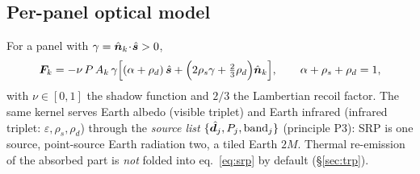 \subsection{Per-panel optical model}
For a panel with $\gamma=\hat{\bm{n}}_k\!\cdot\!\hat{\bm{s}}>0$,
\begin{equation}
\bm{F}_k=-\nu\,P\,A_k\,\gamma\Big[(\alpha+\rho_d)\,\hat{\bm{s}}+\Big(2\rho_s\gamma+\tfrac23\rho_d\Big)\hat{\bm{n}}_k\Big],\qquad \alpha+\rho_s+\rho_d=1,
\label{eq:srp}
\end{equation}
with $\nu\in[0,1]$ the shadow function and $2/3$ the Lambertian recoil factor. The same kernel serves Earth albedo (visible triplet) and Earth infrared (infrared triplet: $\varepsilon,\rho_s,\rho_d$) through the \emph{source list} $\{\hat{\bm{d}}_j,P_j,\text{band}_j\}$ (principle P3): SRP is one source, point-source Earth radiation two, a tiled Earth $2M$. Thermal re-emission of the absorbed part is \emph{not} folded into eq.~\eqref{eq:srp} by default (\S\ref{sec:trp}).

